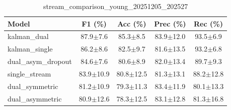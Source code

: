 \begin{table}[h]
\centering
\caption{stream_comparison_young_20251205_202527}
\label{tab:results}
\begin{tabular}{lcccc}
\toprule
Model & F1 (\%) & Acc (\%) & Prec (\%) & Rec (\%) \\
\midrule
kalman\_dual & 87.9$\pm$7.6 & 85.3$\pm$8.5 & 83.9$\pm$12.0 & 93.5$\pm$6.9 \\
kalman\_single & 86.2$\pm$8.6 & 82.5$\pm$9.7 & 81.6$\pm$13.5 & 93.2$\pm$6.8 \\
dual\_asym\_dropout & 84.6$\pm$7.6 & 80.6$\pm$8.9 & 82.0$\pm$13.4 & 89.7$\pm$9.3 \\
single\_stream & 83.9$\pm$10.9 & 80.8$\pm$12.5 & 81.3$\pm$13.1 & 88.2$\pm$12.8 \\
dual\_symmetric & 81.2$\pm$10.9 & 79.3$\pm$11.3 & 83.4$\pm$11.9 & 80.1$\pm$13.3 \\
dual\_asymmetric & 80.9$\pm$12.6 & 78.3$\pm$12.5 & 83.1$\pm$12.8 & 81.3$\pm$16.8 \\
\bottomrule
\end{tabular}
\end{table}